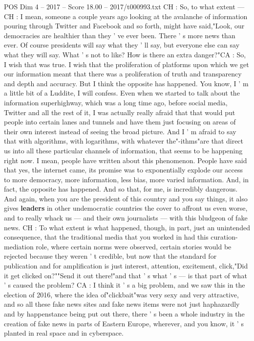 \begin{textsample}{POS Dim 4 – 2017 – Score 18.00 – 2017/t000993.txt}
CH : So, to what extent — CH : I mean, someone a couple years ago looking at the avalanche of information pouring through Twitter and Facebook and so forth, might have said,"Look, our democracies are healthier than they ' ve ever been.
There ' s more news than ever.
Of course presidents will say what they ' ll say, but everyone else can say what they will say.
What ' s not to like?
How is there an extra danger?"CA : So, I wish that was true.
I wish that the proliferation of platforms upon which we get our information meant that there was a proliferation of truth and transparency and depth and accuracy.
But I think the opposite has happened.
You know, I ' m a little bit of a Luddite, I will confess.
Even when we started to talk about the information superhighway, which was a long time ago, before social media, Twitter and all the rest of it, I was actually really afraid that that would put people into certain lanes and tunnels and have them just focusing on areas of their own interest instead of seeing the broad picture.
And I ' m afraid to say that with algorithms, with logarithms, with whatever the"-ithms"are that direct us into all these particular channels of information, that seems to be happening right now.
I mean, people have written about this phenomenon.
People have said that yes, the internet came, its promise was to exponentially explode our access to more democracy, more information, less bias, more varied information.
And, in fact, the opposite has happened.
And so that, for me, is incredibly dangerous.
And again, when you are the president of this country and you say things, it also gives \textbf{leaders} in other undemocratic countries the cover to affront us even worse, and to really whack us — and their own journalists — with this bludgeon of fake news.
CH : To what extent is what happened, though, in part, just an unintended consequence, that the traditional media that you worked in had this curation- mediation role, where certain norms were observed, certain stories would be rejected because they weren ' t credible, but now that the standard for publication and for amplification is just interest, attention, excitement, click,"Did it get clicked on?""Send it out there!"and that ' s what ' s — is that part of what ' s caused the problem?
CA : I think it ' s a big problem, and we saw this in the election of 2016, where the idea of"clickbait"was very sexy and very attractive, and so all these fake news sites and fake news items were not just haphazardly and by happenstance being put out there, there ' s been a whole industry in the creation of fake news in parts of Eastern Europe, wherever, and you know, it ' s planted in real space and in cyberspace.

\end{textsample}
